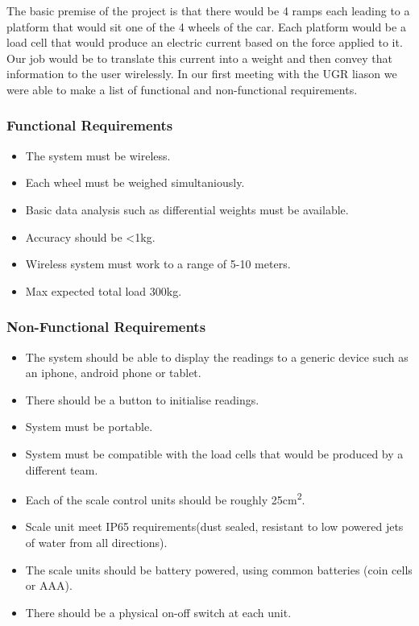 The basic premise of the project is that there would be 4 ramps each leading to a platform that would sit one of the 4 wheels of the car. Each platform would be a load cell that would produce an electric current based on the force applied to it. Our job would be to translate this current into a weight and then convey that information to the user wirelessly. In our first meeting with the UGR liason we were able to make a list of functional and non-functional requirements. 

\subsubsection{Functional Requirements}
\label{functional}
\begin{itemize}
\item The system must be wireless.
\item Each wheel must be weighed simultaniously.
\item Basic data analysis such as differential weights must be available.
\item Accuracy should be \textless 1kg.
\item Wireless system must work to a range of 5-10 meters.
\item Max expected total load 300kg.
\end{itemize}

\subsubsection{Non-Functional Requirements}
\label{non-functional}
\begin{itemize}
\item The system should be able to display the readings to a generic device such as an iphone, android phone or tablet. 
\item There should be a button to initialise readings.
\item System must be portable.
\item System must be compatible with the load cells that would be produced by a different team.
\item Each of the scale control units should be roughly 25cm\textsuperscript{2}.
\item Scale unit meet IP65 requirements(dust sealed, resistant to low powered jets of water from all directions).
\item The scale units should be battery powered, using common batteries (coin cells or AAA).
\item There should be a physical on-off switch at each unit.
\end{itemize}